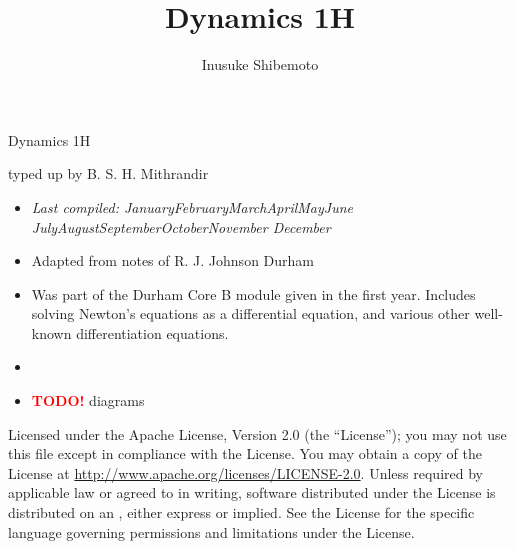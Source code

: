 \documentclass[letter-paper]{tufte-book}
\title{Dynamics 1H}
\author[]{Inusuke Shibemoto}
\newcommand{\monthyear}{%
  \ifcase\month\or January\or February\or March\or April\or May\or June\or
  July\or August\or September\or October\or November\or
  December\fi\space\number\year
}
\newcommand{\TODO}{\textcolor{red}{\bf TODO!}\xspace}
\begin{document}



\chapter*{}

\begin{fullwidth}

\par \begin{center}{\Huge Dynamics 1H}\end{center}

\vspace*{5mm}

\par \begin{center}{\Large typed up by B. S. H. Mithrandir}\end{center}

\vspace*{5mm}

\begin{itemize}
  \item \textit{Last compiled: \monthyear}
  \item Adapted from notes of R. J. Johnson Durham
  \item Was part of the Durham Core B module given in the first year. Includes
  solving Newton's equations as a differential equation, and various other
  well-known differentiation equations.
  \item[]
  \item \TODO diagrams
\end{itemize}

\par

\par Licensed under the Apache License, Version 2.0 (the ``License''); you may not
use this file except in compliance with the License. You may obtain a copy
of the License at \url{http://www.apache.org/licenses/LICENSE-2.0}. Unless
required by applicable law or agreed to in writing, software distributed
under the License is distributed on an , either express or implied. See the
License for the specific language governing permissions and limitations
under the License.
\end{fullwidth}
\end{document}
